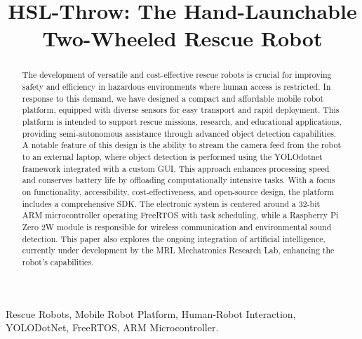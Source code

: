 \documentclass[conference]{IEEEtran}
\begin{document}
\title{HSL-Throw: The Hand-Launchable Two-Wheeled Rescue Robot}

\author{
\and
{}
}
\maketitle

\begin{abstract}
The development of versatile and cost-effective rescue robots is crucial for improving safety and efficiency in hazardous environments where human access is restricted. In response to this demand, we have designed a compact and affordable mobile robot platform, equipped with diverse sensors for easy transport and rapid deployment. This platform is intended to support rescue missions, research, and educational applications, providing semi-autonomous assistance through advanced object detection capabilities. A notable feature of this design is the ability to stream the camera feed from the robot to an external laptop, where object detection is performed using the YOLOdotnet framework integrated with a custom GUI. This approach enhances processing speed and conserves battery life by offloading computationally intensive tasks. With a focus on functionality, accessibility, cost-effectiveness, and open-source design, the platform includes a comprehensive SDK. The electronic system is centered around a 32-bit ARM microcontroller operating FreeRTOS with task scheduling, while a Raspberry Pi Zero 2W module is responsible for wireless communication and environmental sound detection. This paper also explores the ongoing integration of artificial intelligence, currently under development by the MRL Mechatronics Research Lab, enhancing the robot's capabilities.\\
\end{abstract}

\begin{IEEEkeywords}
Rescue Robots, Mobile Robot Platform, Human-Robot Interaction, YOLODotNet, FreeRTOS, ARM Microcontroller.
\end{IEEEkeywords}
\end{document}

